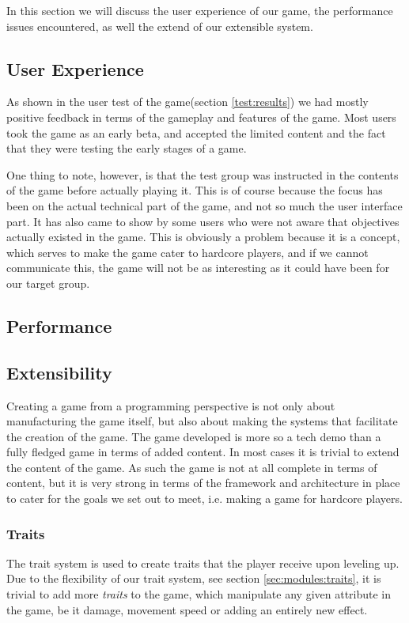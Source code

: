 In this section we will discuss the user experience of our game, the performance issues encountered, as well the extend of our extensible system.

\subsection{User Experience}
As shown in the user test of the game(section \ref{test:results}) we had mostly positive feedback in terms of the gameplay and features of the game.
Most users took the game as an early beta, and accepted the limited content and the fact that they were testing the early stages of a game.

One thing to note, however, is that the test group was instructed in the contents of the game before actually playing it. 
This is of course because the focus has been on the actual technical part of the game, and not so much the user interface part.
It has also came to show by some users who were not aware that objectives actually existed in the game.
This is obviously a problem because it is a concept, which serves to make the game cater to hardcore players, and if we cannot communicate this, the game will not be as interesting as it could have been for our target group.

\subsection{Performance}

\subsection{Extensibility}
Creating a game from a programming perspective is not only about manufacturing the game itself, but also about making the systems that facilitate the creation of the game.
The game developed is more so a tech demo than a fully fledged game in terms of added content.
In most cases it is trivial to extend the content of the game. 
As such the game is not at all complete in terms of content, but it is very strong in terms of the framework and architecture in place to cater for the goals we set out to meet, i.e. making a game for hardcore players.

\subsubsection{Traits}\label{dicsussion:traits}
The trait system is used to create traits that the player receive upon leveling up.
Due to the flexibility of our trait system, see section \ref{sec:modules:traits}, it is trivial to add more \emph{traits} to the game, which manipulate any given attribute in the game, be it damage, movement speed or adding an entirely new effect. 

